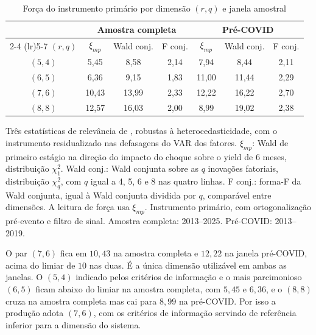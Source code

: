\documentclass[preprint,authoryear,review,12pt]{elsarticle}
\begin{document}
\begin{table}[H]
\centering
\caption{Força do instrumento primário por dimensão $(r, q)$ e janela amostral}
\label{tab:rq_sweep}
\begin{threeparttable}
\begin{tabular}{c ccc ccc}
\toprule
 & \multicolumn{3}{c}{Amostra completa} & \multicolumn{3}{c}{Pré-COVID} \\
\cmidrule(lr){2-4} \cmidrule(lr){5-7}
$(r, q)$ & $\xi_{mp}$ & Wald conj. & F conj. & $\xi_{mp}$ & Wald conj. & F conj. \\
\midrule
$(5, 4)$ &  5,45 &  8,58 & 2,14 &  7,94 &  8,44 & 2,11 \\
$(6, 5)$ &  6,36 &  9,15 & 1,83 & 11,00 & 11,44 & 2,29 \\
$(7, 6)$ & 10,43 & 13,99 & 2,33 & 12,22 & 16,22 & 2,70 \\
$(8, 8)$ & 12,57 & 16,03 & 2,00 &  8,99 & 19,02 & 2,38 \\
\bottomrule
\end{tabular}
\begin{tablenotes}[flushleft]
\footnotesize
\item Três estatísticas de relevância de \cite{montielolea}, robustas à heterocedasticidade, com o instrumento residualizado nas defasagens do VAR dos fatores. $\xi_{mp}$: Wald de primeiro estágio na direção do impacto do choque sobre o yield de 6 meses, distribuição $\chi^2_1$. Wald conj.: Wald conjunta sobre as $q$ inovações fatoriais, distribuição $\chi^2_q$, com $q$ igual a 4, 5, 6 e 8 nas quatro linhas. F conj.: forma-F da Wald conjunta, igual à Wald conjunta dividida por $q$, comparável entre dimensões. A leitura de força usa $\xi_{mp}$. Instrumento primário, com ortogonalização pré-evento e filtro de sinal. Amostra completa: 2013--2025. Pré-COVID: 2013--2019.
\end{tablenotes}
\end{threeparttable}
\end{table}

O par $(7, 6)$ fica em $10{,}43$ na amostra completa e $12{,}22$ na janela pré-COVID, acima do limiar de $10$ nas duas. É a única dimensão utilizável em ambas as janelas. O $(5, 4)$ indicado pelos critérios de informação e o mais parcimonioso $(6, 5)$ ficam abaixo do limiar na amostra completa, com $5{,}45$ e $6{,}36$, e o $(8, 8)$ cruza na amostra completa mas cai para $8{,}99$ na pré-COVID. Por isso a produção adota $(7, 6)$, com os critérios de informação servindo de referência inferior para a dimensão do sistema.
\end{document}
